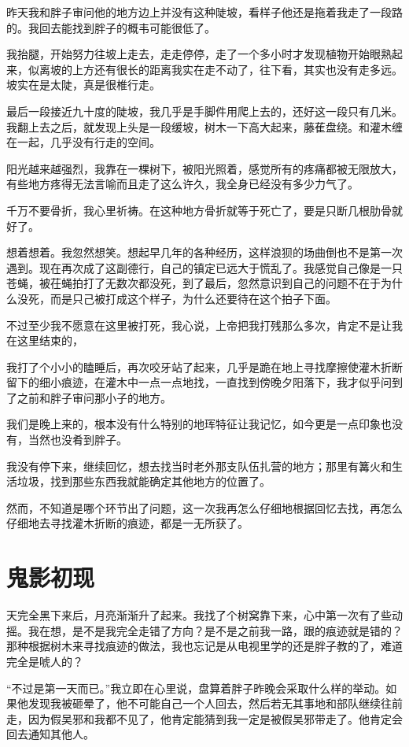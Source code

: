 昨天我和胖子审问他的地方边上并没有这种陡坡，看样子他还是拖着我走了一段路的。我回去能找到胖子的概韦可能很低了。

我抬腿，开始努力往坡上走去，走走停停，走了一个多小时才发现植物开始眼熟起来，似离坡的上方还有很长的距离我实在走不动了，往下看，其实也没有走多远。坡实在是太陡，真是很椎行走。

最后一段接近九十度的陡坡，我几乎是手脚件用爬上去的，还好这一段只有几米。我翻上去之后，就发现上头是一段缓坡，树木一下高大起来，藤萑盘绕。和灌木缠在一起，几乎没有行走的空间。

阳光越来越强烈，我靠在一棵树下，被阳光照着，感觉所有的疼痛都被无限放大，有些地方疼得无法言喻而且走了这么许久，我全身已经没有多少力气了。

千万不要骨折，我心里祈祷。在这种地方骨折就等于死亡了，要是只断几根肋骨就好了。

想着想着。我忽然想笑。想起早几年的各种经历，这样浪狈的场曲倒也不是第一次遇到。现在再次成了这副德行，自己的镇定已远大于慌乱了。我感觉自己像是一只苍蝇，被茌蝇拍打了无数次都没死，到了最后，忽然意识到自己的问题不在于为什么没死，而是只己被打成这个样子，为什么还要待在这个拍子下面。

不过至少我不愿意在这里被打死，我心说，上帝把我打残那么多次，肯定不是让我在这里结束的，

我打了个小小的瞌睡后，再次咬牙站了起来，几乎是跪在地上寻找摩擦使灌木折断留下的细小痕迹，在灌木中一点一点地找，一直找到傍晚夕阳落下，我才似乎问到了之前和胖子审问那小子的地方。

我们是晚上来的，根本没有什么特别的地珲特征让我记忆，如今更是一点印象也没有，当然也没肴到胖子。

我没有停下来，继续回忆，想去找当时老外那支队伍扎营的地方；那里有篝火和生活垃圾，找到那些东西我就能确定其他地方的位置了。

然而，不知道是哪个环节出了问题，这一次我再怎么仔细地根据回忆去找，再怎么仔细地去寻找灌木折断的痕迹，都是一无所获了。

\chapter{鬼影初现}

天完全黑下来后，月亮渐渐升了起来。我找了个树窝靠下来，心中第一次有了些动摇。我在想，是不是我完全走错了方向？是不是之前我一路，跟的痕迹就是错的？那种根据树木来寻找痕迹的做法，我也忘记是从电视里学的还是胖子教的了，难道完全是唬人的？

“不过是第一天而已。”我立即在心里说，盘算着胖子昨晚会采取什么样的举动。如果他发现我被砸晕了，他不可能自己一个人回去，然后若无其事地和部队继续往前走，因为假吴邪和我都不见了，他肯定能猜到我一定是被假吴邪带走了。他肯定会回去通知其他人。

